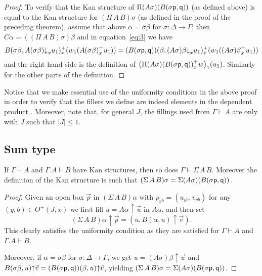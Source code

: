 \documentclass[10pt,a4paper]{article}
\newcommand{\pp}{{\sf p}}
\newcommand{\qq}{{\sf q}}
\newcommand{\rup}[1]{#1{\uparrow}}
\newcommand{\rdo}[1]{#1{\downarrow}}
\begin{document}
\begin{proof}
  To verify that the Kan structure of $\Pi (A \sigma) (B (\sigma \pp,
  \qq))$ (as defined above) is equal to the Kan structure for
  $(\Pi\,A\,B) \sigma$ (as defined in the proof of the preceding
  theorem), assume that above $\alpha = \sigma \beta$ for $\sigma
  \colon \Delta \to \Gamma$; then $C \alpha = ((\Pi\,A\,B) \sigma)
  \beta$ and in equation~\eqref{eq:3} we have
  \[
  B(\sigma \beta,\rdo{A(\sigma \beta)}_x u_1)^+_x (w_1 ({A(\sigma
    \beta)}^-_x u_1)) = (B (\sigma \pp, \qq)) (\beta, \rdo{(A\sigma)
    \beta}_x u_1)^+_x (w_1 ({(A \sigma) \beta}^-_x u_1))
  \]
  and the right hand side is the definition of $\bigl({\Pi(A \sigma)
    (B (\sigma \pp, \qq))}^+_x w\bigr)_1 (u_1)$.  Similarly for the
  other parts of the definition.
\end{proof}

Notice that we make essential use of the uniformity conditions in the
above proof in order to verify that the fillers we define are indeed
elements in the dependent product .  Moreover, note that, for general
$J$, the fillings used from $\Gamma \vdash A$ are only with $J$ such
that $\lvert J \rvert \leq 1$.

\subsection{Sum type}

\begin{theorem}
  If $\Gamma \vdash A$ and $\Gamma.A \vdash B$ have Kan structures,
  then so does $\Gamma \vdash \Sigma\,A\,B$.  Moreover the definition
  of the Kan structure is such that $(\Sigma\,A\,B) \sigma = \Sigma (A
  \sigma) (B (\sigma \pp, \qq))$.
\end{theorem}
\begin{proof}
  Given an open box $\vec p$ in $(\Sigma\,A\,B) \alpha$ with
  $p_{yb}=(u_{yb},v_{yb})$ for any $(y,b)\in O^+(J,x)$ we first fill
  $u = \rup {A \alpha} {\vec u}$ in $A \alpha$, and then set
  \[
  \rup{(\Sigma\,A\,B) \alpha} {\vec p} = (u, \rup {B (\alpha, u)}
  {\vec v}).
  \]
  This clearly satisfies the uniformity condition as they are
  satisfied for $\Gamma \vdash A$ and $\Gamma.A \vdash B$.

  Moreover, if $\alpha = \sigma \beta$ for $\sigma \colon \Delta \to
  \Gamma$, we get $u = \rup {(A \sigma) \beta} {\vec u}$ and $\rup {B
    (\sigma \beta, u)} {\vec v} = \rup{(B (\sigma \pp, \qq)) (\beta,
    u)} {\vec v}$, yielding $(\Sigma\,A\,B) \sigma = \Sigma (A \sigma)
  (B (\sigma \pp, \qq))$.
\end{proof}
\end{document}
